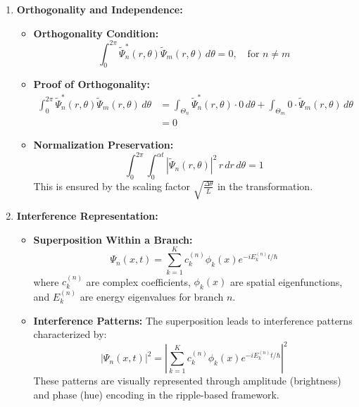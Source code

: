 \documentclass[12pt]{article}
\begin{document}
\begin{enumerate}
    \item \textbf{Orthogonality and Independence:}
    \begin{itemize}
        \item \textbf{Orthogonality Condition:}
        \[
        \int_{0}^{2\pi} \tilde{\Psi}_n^*(r, \theta) \tilde{\Psi}_m(r, \theta) \, d\theta = 0, \quad \text{for } n \neq m
        \]
        
        \item \textbf{Proof of Orthogonality:}
        \begin{align*}
            \int_{0}^{2\pi} \tilde{\Psi}_n^*(r, \theta) \tilde{\Psi}_m(r, \theta) \, d\theta 
            &= \int_{\Theta_n} \tilde{\Psi}_n^*(r, \theta) \cdot 0 \, d\theta + \int_{\Theta_m} 0 \cdot \tilde{\Psi}_m(r, \theta) \, d\theta \\
            &= 0
        \end{align*}
        
        \item \textbf{Normalization Preservation:}
        \[
        \int_{0}^{2\pi} \int_{0}^{\alpha t} |\tilde{\Psi}_n(r,\theta)|^2 \, r \, dr \, d\theta = 1
        \]
        This is ensured by the scaling factor \(\sqrt{\frac{\Delta\theta}{L}}\) in the transformation.
    \end{itemize}
    
    \item \textbf{Interference Representation:}
    \begin{itemize}
        \item \textbf{Superposition Within a Branch:}
        \[
        \Psi_n(x,t) = \sum_{k=1}^{K} c_{k}^{(n)} \phi_{k}(x) e^{-i E_{k}^{(n)} t / \hbar}
        \]
        where \(c_{k}^{(n)}\) are complex coefficients, \(\phi_{k}(x)\) are spatial eigenfunctions, and \(E_{k}^{(n)}\) are energy eigenvalues for branch \(n\).
        
        \item \textbf{Interference Patterns:}
        The superposition leads to interference patterns characterized by:
        \[
        |\Psi_n(x,t)|^2 = \left| \sum_{k=1}^{K} c_{k}^{(n)} \phi_{k}(x) e^{-i E_{k}^{(n)} t / \hbar} \right|^2
        \]
        These patterns are visually represented through amplitude (brightness) and phase (hue) encoding in the ripple-based framework.
        

\end{itemize}
\end{enumerate}
\end{document}
